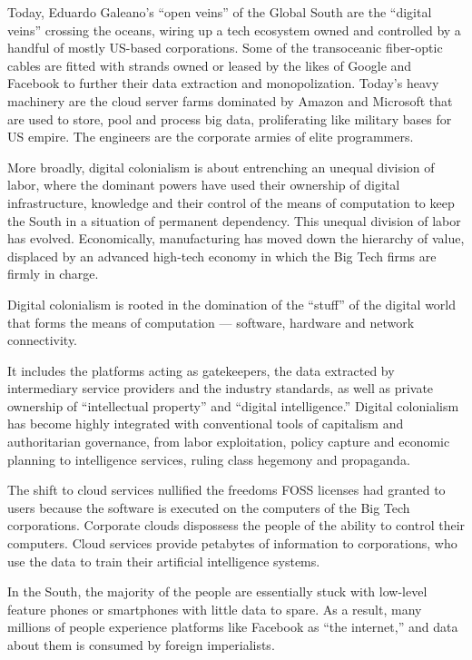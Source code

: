 \documentclass[
]{book}
\begin{document}
Today, Eduardo Galeano's ``open veins'' of the Global South are the ``digital veins'' crossing the oceans, wiring up a tech ecosystem owned and controlled by a handful of mostly US-based corporations. Some of the transoceanic fiber-optic cables are fitted with strands owned or leased by the likes of Google and Facebook to further their data extraction and monopolization. Today's heavy machinery are the cloud server farms dominated by Amazon and Microsoft that are used to store, pool and process big data, proliferating like military bases for US empire. The engineers are the corporate armies of elite programmers.

More broadly, digital colonialism is about entrenching an unequal division of labor, where the dominant powers have used their ownership of digital infrastructure, knowledge and their control of the means of computation to keep the South in a situation of permanent dependency. This unequal division of labor has evolved. Economically, manufacturing has moved down the hierarchy of value, displaced by an advanced high-tech economy in which the Big Tech firms are firmly in charge.

Digital colonialism is rooted in the domination of the ``stuff'' of the digital world that forms the means of computation --- software, hardware and network connectivity.

It includes the platforms acting as gatekeepers, the data extracted by intermediary service providers and the industry standards, as well as private ownership of ``intellectual property'' and ``digital intelligence.'' Digital colonialism has become highly integrated with conventional tools of capitalism and authoritarian governance, from labor exploitation, policy capture and economic planning to intelligence services, ruling class hegemony and propaganda.

The shift to cloud services nullified the freedoms FOSS licenses had granted to users because the software is executed on the computers of the Big Tech corporations. Corporate clouds dispossess the people of the ability to control their computers. Cloud services provide petabytes of information to corporations, who use the data to train their artificial intelligence systems.

In the South, the majority of the people are essentially stuck with low-level feature phones or smartphones with little data to spare. As a result, many millions of people experience platforms like Facebook as ``the internet,'' and data about them is consumed by foreign imperialists.
\end{document}
